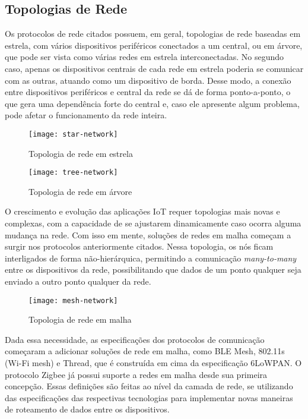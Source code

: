 \documentclass[../monografia.tex]{subfiles}
\begin{document}
 
\subsection{Topologias de Rede} \label{topologias-rede}

Os protocolos de rede citados possuem, em geral, topologias de rede baseadas em estrela, com vários dispositivos periféricos conectados a um central, ou em árvore, que pode ser vista como várias redes em estrela interconectadas. No segundo caso, apenas os dispositivos centrais de cada rede em estrela poderia se comunicar com as outras, atuando como um dispositivo de borda. Desse modo, a conexão entre dispositivos periféricos e central da rede se dá de forma ponto-a-ponto, o que gera uma dependência forte do central e, caso ele apresente algum problema, pode afetar o funcionamento da rede inteira.

\begin{figure}[h!]
\centering
\begin{minipage}{.5\textwidth}
	\centering	
	\texttt{[image: star-network]}
	\caption{Topologia de rede em estrela}
	\label{fig:Rede em estrela}
\end{minipage}%
\begin{minipage}{.5\textwidth}
	\centering
	\texttt{[image: tree-network]}
	\caption{Topologia de rede em árvore}
	\label{fig:Rede em árvore}
\end{minipage}

\end{figure}


O crescimento e evolução das aplicações IoT requer topologias mais novas e complexas, com a capacidade de se ajustarem dinamicamente caso ocorra alguma mudança na rede. Com isso em mente, soluções de redes em malha começam a surgir nos protocolos anteriormente citados. Nessa topologia, os nós ficam interligados de forma não-hierárquica, permitindo a comunicação \textit{many-to-many} entre os dispositivos da rede, possibilitando que dados de um ponto qualquer seja enviado a outro ponto qualquer da rede. 


\begin{figure}[h!]
\centering
	\texttt{[image: mesh-network]}
	\caption{Topologia de rede em malha}
	\label{fig:Rede em malha}
\end{figure}

Dada essa necessidade, as especificações dos protocolos de comunicação começaram a adicionar soluções de rede em malha, como BLE Mesh, 802.11s (Wi-Fi mesh) e Thread, que é construída em cima da especificação 6LoWPAN. O protocolo Zigbee já possui suporte a redes em malha desde sua primeira concepção. Essas definições são feitas ao nível da camada de rede, se utilizando das especificações das respectivas tecnologias para implementar novas maneiras de roteamento de dados entre os dispositivos.
\end{document}
